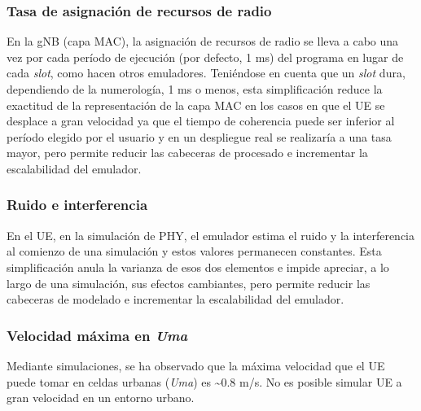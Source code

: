 \documentclass[12pt]{report} %
\begin{document}
\subsubsection{Tasa de asignación de recursos de radio}

En la gNB (capa MAC), la asignación de recursos de radio se lleva a cabo una vez por cada período de ejecución (por defecto, 1 ms) del programa en lugar de cada \textit{slot}, como hacen otros emuladores.
Teniéndose en cuenta que un \textit{slot} dura, dependiendo de la numerología, 1 ms o menos,
esta simplificación reduce la exactitud de la representación de la capa MAC en los casos en que el UE se desplace a gran velocidad ya que el tiempo de coherencia puede ser inferior al período elegido por el usuario y en un despliegue real se realizaría a una tasa mayor,
pero permite reducir las cabeceras de procesado e incrementar la escalabilidad del emulador.
\cite{RefWorks:3, RefWorks:7}

\subsubsection{Ruido e interferencia}

En el UE, en la simulación de PHY, el emulador estima el ruido y la interferencia al comienzo de una simulación y estos valores permanecen constantes.
Esta simplificación anula la varianza de esos dos elementos e impide apreciar, a lo largo de una simulación, sus efectos cambiantes,
pero permite reducir las cabeceras de modelado e incrementar la escalabilidad del emulador.
\cite{RefWorks:5, RefWorks:3, RefWorks:7}

\subsubsection{Velocidad máxima en \textit{Uma}}

Mediante simulaciones, se ha observado que la máxima velocidad que el UE puede tomar en celdas urbanas (\textit{Uma}) es \textasciitilde 0.8 m/s.
No es posible simular UE a gran velocidad en un entorno urbano.

%
\end{document}
